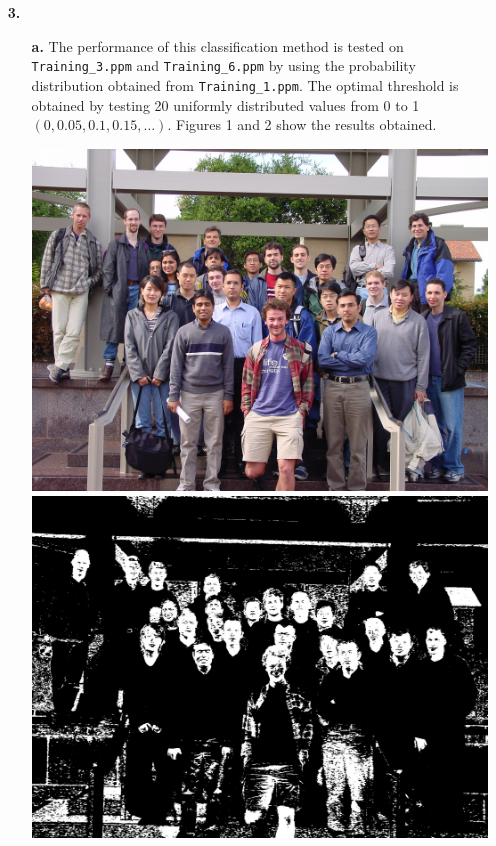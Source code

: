 \documentclass[ 12pt ]{article}
\begin{document}
\begin{enumerate}
    \item[\textbf{3.}]
        \begin{enumerate}
                    \item[\textbf{a.}] The performance of this classification method is tested on \verb|Training_3.ppm| and \verb|Training_6.ppm| by using the probability distribution obtained from \verb|Training_1.ppm|. The optimal threshold is obtained by testing 20 uniformly distributed values from 0 to 1 $(0, 0.05, 0.1, 0.15, \hdots)$. Figures 1 and 2 show the results obtained.
\begin{center}
    \includegraphics[scale=0.1]{Training_3}
    \includegraphics[scale=0.1]{classified3a-1}
    \newline

\end{center}
\end{enumerate}
\end{enumerate}
\end{document}
